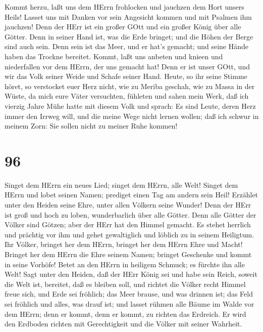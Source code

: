  Kommt herzu, laßt uns dem HErrn frohlocken und jauchzen dem
Hort unsers Heils!  Lasset uns mit Danken vor sein Angesicht
kommen und mit Psalmen ihm jauchzen!  Denn der HErr ist ein
großer GOtt und ein großer König über alle Götter.  Denn in
seiner Hand ist, was die Erde bringet; und die Höhen der Berge sind auch
sein.  Denn sein ist das Meer, und er hat's gemacht; und
seine Hände haben das Trockne bereitet.  Kommt, laßt uns
anbeten und knieen und niederfallen vor dem HErrn, der uns gemacht hat!
 Denn er ist unser GOtt, und wir das Volk seiner Weide und
Schafe seiner Hand. Heute, so ihr seine Stimme höret,  so
verstocket euer Herz nicht, wie zu Meriba geschah, wie zu Massa in der
Wüste,  da mich eure Väter versuchten, fühleten und sahen
mein Werk,  daß ich vierzig Jahre Mühe hatte mit diesem
Volk und sprach: Es sind Leute, deren Herz immer den Irrweg will, und
die meine Wege nicht lernen wollen;  daß ich schwur in
meinem Zorn: Sie sollen nicht zu meiner Ruhe kommen!

\hypertarget{section-95}{%
\section{96}\label{section-95}}

 Singet dem HErrn ein neues Lied; singet dem HErrn, alle
Welt!  Singet dem HErrn und lobet seinen Namen; prediget
einen Tag am andern sein Heil!  Erzählet unter den Heiden
seine Ehre, unter allen Völkern seine Wunder!  Denn der HErr
ist groß und hoch zu loben, wunderbarlich über alle Götter. 
Denn alle Götter der Völker sind Götzen; aber der HErr hat den Himmel
gemacht.  Es stehet herrlich und prächtig vor ihm und gehet
gewaltiglich und löblich zu in seinem Heiligtum.  Ihr
Völker, bringet her dem HErrn, bringet her dem HErrn Ehre und Macht!
 Bringet her dem HErrn die Ehre seinem Namen; bringet
Geschenke und kommt in seine Vorhöfe!  Betet an den HErrn in
heiligem Schmuck; es fürchte ihn alle Welt!  Sagt unter den
Heiden, daß der HErr König sei und habe sein Reich, soweit die Welt ist,
bereitet, daß es bleiben soll, und richtet die Völker recht
 Himmel freue sich, und Erde sei fröhlich; das Meer brause,
und was drinnen ist;  das Feld sei fröhlich und alles, was
drauf ist; und lasset rühmen alle Bäume im Walde  vor dem
HErrn; denn er kommt, denn er kommt, zu richten das Erdreich. Er wird
den Erdboden richten mit Gerechtigkeit und die Völker mit seiner
Wahrheit.

